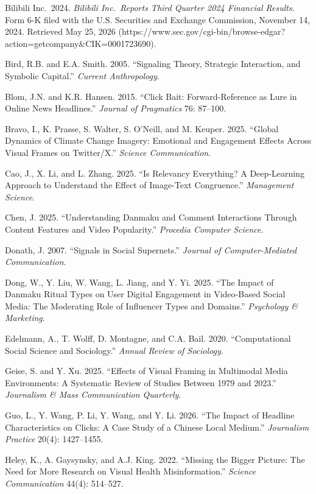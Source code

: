\documentclass[
  12pt,
]{article}
\begin{document}
Bilibili Inc.~2024. \emph{Bilibili Inc.~Reports Third Quarter 2024
Financial Results}. Form 6-K filed with the U.S. Securities and Exchange
Commission, November 14, 2024. Retrieved May 25, 2026
(https://www.sec.gov/cgi-bin/browse-edgar?action=getcompany\&CIK=0001723690).

Bird, R.B. and E.A. Smith. 2005. ``Signaling Theory, Strategic
Interaction, and Symbolic Capital.'' \emph{Current Anthropology}.

Blom, J.N. and K.R. Hansen. 2015. ``Click Bait: Forward-Reference as
Lure in Online News Headlines.'' \emph{Journal of Pragmatics} 76:
87--100.

Bravo, I., K. Prasse, S. Walter, S. O'Neill, and M. Keuper. 2025.
``Global Dynamics of Climate Change Imagery: Emotional and Engagement
Effects Across Visual Frames on Twitter/X.'' \emph{Science
Communication}.

Cao, J., X. Li, and L. Zhang. 2025. ``Is Relevancy Everything? A
Deep-Learning Approach to Understand the Effect of Image-Text
Congruence.'' \emph{Management Science}.

Chen, J. 2025. ``Understanding Danmaku and Comment Interactions Through
Content Features and Video Popularity.'' \emph{Procedia Computer
Science}.

Donath, J. 2007. ``Signals in Social Supernets.'' \emph{Journal of
Computer-Mediated Communication}.

Dong, W., Y. Liu, W. Wang, L. Jiang, and Y. Yi. 2025. ``The Impact of
Danmaku Ritual Types on User Digital Engagement in Video-Based Social
Media: The Moderating Role of Influencer Types and Domains.''
\emph{Psychology \& Marketing}.

Edelmann, A., T. Wolff, D. Montagne, and C.A. Bail. 2020.
``Computational Social Science and Sociology.'' \emph{Annual Review of
Sociology}.

Geise, S. and Y. Xu. 2025. ``Effects of Visual Framing in Multimodal
Media Environments: A Systematic Review of Studies Between 1979 and
2023.'' \emph{Journalism \& Mass Communication Quarterly}.

Guo, L., Y. Wang, P. Li, Y. Wang, and Y. Li. 2026. ``The Impact of
Headline Characteristics on Clicks: A Case Study of a Chinese Local
Medium.'' \emph{Journalism Practice} 20(4): 1427--1455.

Heley, K., A. Gaysynsky, and A.J. King. 2022. ``Missing the Bigger
Picture: The Need for More Research on Visual Health Misinformation.''
\emph{Science Communication} 44(4): 514--527.
\end{document}
